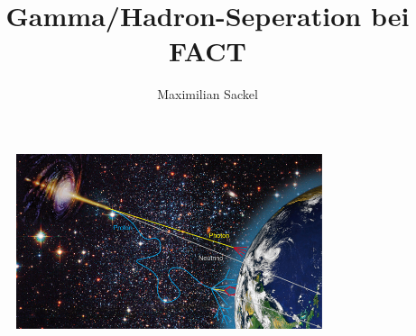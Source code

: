 \documentclass[aspectratio=1610, professionalfonts, 9pt]{beamer}
\title{Gamma/Hadron-Seperation bei FACT}
\author[M.~Sackel]{Maximilian Sackel}
\institute[Experimental Physics 5]{Experimental Physiks 5b \\  Astroteilchenphysik}
\begin{document}
\maketitle

\begin{frame}
  \begin{figure}
	\centering
	\includegraphics[width=0.8\textwidth]{./images/sources-detection.jpg} \\
	\caption{\cite{Overview}}
  \end{figure}
\end{frame}
\end{document}
